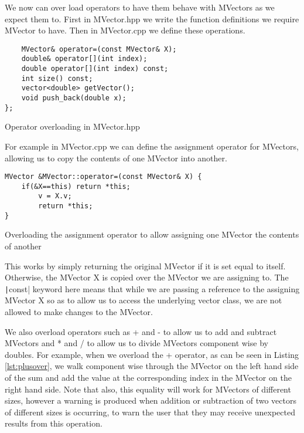 \documentclass[a4paper,11pt]{report}
\begin{document}
We now can over load operators to have them behave with MVectors as we expect them to. First in MVector.hpp we write the function definitions we require MVector to have. Then in MVector.cpp we define these operations.

\begin{listing}
\begin{verbatim}
	MVector& operator=(const MVector& X);
	double& operator[](int index);
	double operator[](int index) const;
	int size() const;
	vector<double> getVector();
	void push_back(double x);
};
\end{verbatim}
\caption{Operator overloading in MVector.hpp}
\end{listing}

For example in MVector.cpp we can define the assignment operator for MVectors, allowing us to copy the contents of one MVector into another.

\begin{listing}
\begin{verbatim}
MVector &MVector::operator=(const MVector& X) {
	if(&X==this) return *this;
		v = X.v;
		return *this;
}
\end{verbatim}
\caption{Overloading the assignment operator to allow assigning one MVector the contents of another}
\end{listing}

\pagebreak

This works by simply returning the original MVector if it is set equal to itself. Otherwise, the MVector X is copied over the MVector we are assigning to. The \texttt|const| keyword here means that while we are passing a reference to the assigning MVector X so as to allow us to access the underlying vector class, we are not allowed to make changes to the MVector.

We also overload operators such as + and - to allow us to add and subtract MVectors and * and / to allow us to divide MVectors component wise by doubles. For example, when we overload the + operator, as can be seen in Listing \ref{lst:plusover}, we walk component wise through the MVector on the left hand side of the sum and add the value at the corresponding index in the MVector on the right hand side. Note that also, this equality will work for MVectors of different sizes, however a warning is produced when addition or subtraction of two vectors of different sizes is occurring, to warn the user that they may receive unexpected results from this operation.
\end{document}
